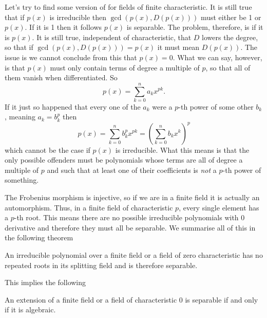 \documentclass[12pt,oneside]{book}
\begin{document}
\parbreak

Let's try to find some version of 
for fields of finite characteristic. It is still true that if \( p(x) \) is irreducible
then \( \gcd(p(x), D(p(x))) \) must either be 1 or \( p(x) \). If it is 1 then it follows
\( p(x) \) is separable. The problem, therefore, is if it is \( p(x) \). It is still true,
independent of characteristic, that \( D \) lowers the degree, so that if \( \gcd(p(x),
D(p(x))) = p(x) \) it must mean \( D(p(x)) \). The issue is we cannot conclude from this
that \( p(x) = 0 \). What we can say, however, is that \( p(x) \) must only contain terms
of degree a multiple of \( p \), so that all of them vanish when differentiated. So
\begin{equation*}
	p(x) = \sum_{k = 0}^{n}a_k x^{pk}. 
\end{equation*}
If it just so happened that every one of the \( a_k \) were a \( p \)-th power of some
other \( b_k \), meaning \( a_k = b_k^p \) then
\begin{equation*}
	p(x) = \sum_{k = 0}^{n}b_k^p x^{pk} = \left(\sum_{k = 0}^{n} b_k x^k\right)^{p}  
\end{equation*}
which cannot be the case if \( p(x) \) is irreducible. What this means is that the only
possible offenders must be polynomials whose terms are all of degree a multiple of \( p \)
and such that at least one of their coefficients is \emph{not} a \( p \)-th power of
something.

The Frobenius morphism is injective, so if we are in a finite field it is actually an
automorphism. Thus, in a finite field of characteristic \( p \), every single element has
a \( p \)-th root. This means there are no possible irreducible polynomials with 0
derivative and therefore they must all be separable. We summarise all of this in the
following theorem
\begin{theorem}
	An irreducible polynomial over a finite field or a field of zero characteristic has no
	repeated roots in its splitting field and is therefore separable.
\end{theorem}
This implies the following
\begin{theorem}
	An extension of a finite field or a field of characteristic 0 is separable if and only
	if it is algebraic.
\end{theorem}
\end{document}
